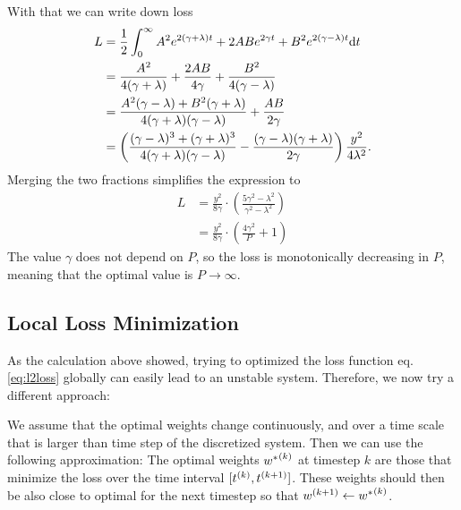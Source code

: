 \documentclass{article}
\begin{document}
    With that we can write down loss
    \begin{align}
        L &= \frac{1}{2} \int_0^{\infty} A^2 e^{2(\gamma + \lambda) t} + 2 A B e^{2\gamma t} + B^2 e^{2(\gamma - \lambda) t} \mathrm{d}t\\
          &= \frac{A^2}{4(\gamma + \lambda)} + \frac{2 A B}{4\gamma} + \frac{B^2}{4(\gamma - \lambda)} \nonumber \\
          &= \frac{A^2 (\gamma - \lambda) + B^2 (\gamma + \lambda)}{4(\gamma + \lambda)(\gamma - \lambda)} + \frac{A B}{2\gamma} \nonumber \\
          &= \left( \frac{(\gamma - \lambda)^3 + (\gamma + \lambda)^3}{4(\gamma + \lambda)(\gamma - \lambda)} - 
          \frac{(\gamma - \lambda) (\gamma + \lambda)}{2\gamma} \right) \frac{y^2}{4 \lambda^2}.
    \end{align}
    Merging the two fractions simplifies the expression to
    \begin{align}
        L &= \frac{y^2}{8 \gamma} \cdot \left( \frac{5 \gamma^2 - \lambda^2}{\gamma^2 - \lambda^2}\right)\\
          &= \frac{y^2}{8 \gamma} \cdot \left( \frac{4 \gamma^2}{P} + 1\right)
    \end{align}
    The value $\gamma$ does not depend on $P$, so the loss is 
    monotonically decreasing in $P$, meaning that the optimal value is $P \rightarrow \infty$.



  \subsection{Local Loss Minimization}
    As the calculation above showed, trying to optimized the loss function eq. \eqref{eq:l2loss} globally can easily
    lead to an unstable system. Therefore, we now try a different approach:

    We assume that the optimal weights change continuously, and over a time scale that is 
    larger than time step of the discretized system. Then we can use the following approximation: The optimal weights 
    ${w^*}^{(k)}$ at timestep $k$ are those that minimize the loss over the time interval $[{t}^{(k)}, {t}^{(k+1)}]$. 
    These weights should then be also close to optimal for the next timestep so that 
    ${w}^{(k+1)} \leftarrow {w^*}^{(k)}$.
\end{document}
